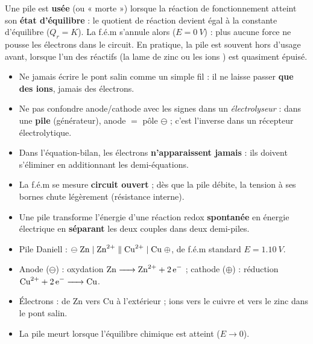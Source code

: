 \documentclass[11pt]{article}
\begin{document}
\begin{aretenir}
Une pile est \textbf{usée} (ou « morte ») lorsque la réaction de fonctionnement atteint son \textbf{état d'équilibre} : le quotient de réaction devient égal à la constante d'équilibre ($Q_r = K$). La f.é.m s'annule alors ($E = \SI{0}{V}$) : plus aucune force ne pousse les électrons dans le circuit. En pratique, la pile est souvent hors d'usage avant, lorsque l'un des réactifs (la lame de zinc ou les ions ) est quasiment épuisé.
\end{aretenir}

\begin{attention}
\begin{itemize}
\item Ne jamais écrire le pont salin comme un simple fil : il ne laisse passer \textbf{que des ions}, jamais des électrons.
\item Ne pas confondre anode/cathode avec les signes dans un \emph{électrolyseur} : dans une \textbf{pile} (générateur), anode $=$ pôle $\ominus$ ; c'est l'inverse dans un récepteur électrolytique.
\item Dans l'équation-bilan, les électrons \textbf{n'apparaissent jamais} : ils doivent s'éliminer en additionnant les demi-équations.
\item La f.é.m se mesure \textbf{circuit ouvert} ; dès que la pile débite, la tension à ses bornes chute légèrement (résistance interne).
\end{itemize}
\end{attention}

\begin{aretenir}
\begin{itemize}
\item Une pile transforme l'énergie d'une réaction redox \textbf{spontanée} en énergie électrique en \textbf{séparant} les deux couples dans deux demi-piles.
\item Pile Daniell : $\ominus \; \ce{Zn} \mid \ce{Zn^2+} \parallel \ce{Cu^2+} \mid \ce{Cu} \; \oplus$, de f.é.m standard $E = \SI{1,10}{V}$.
\item Anode ($\ominus$) : oxydation $\ce{Zn -> Zn^2+ + 2e-}$ ; cathode ($\oplus$) : réduction $\ce{Cu^2+ + 2e- -> Cu}$.
\item Électrons : de Zn vers Cu à l'extérieur ; ions  vers le cuivre et  vers le zinc dans le pont salin.
\item La pile meurt lorsque l'équilibre chimique est atteint ($E \to 0$).
\end{itemize}
\end{aretenir}
\end{document}
